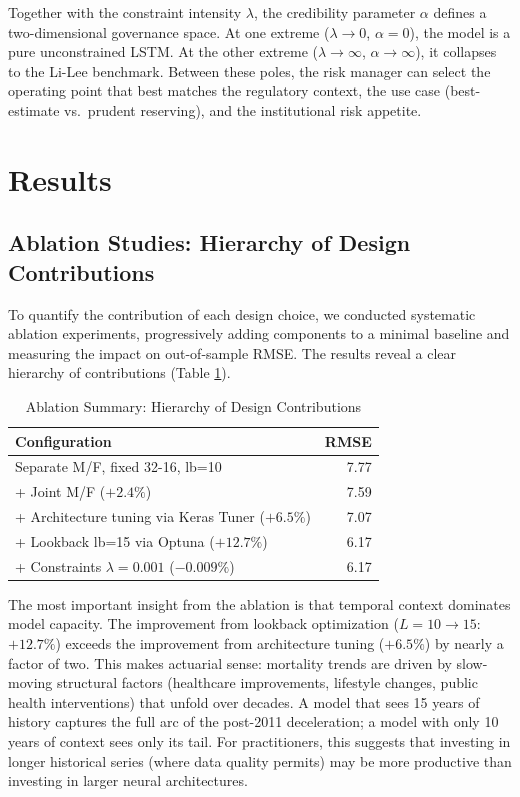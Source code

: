 \documentclass[11pt,a4paper]{article}
\begin{document}
Together with the constraint intensity $\lambda$, the credibility parameter $\alpha$ defines a two-dimensional governance space. At one extreme ($\lambda \to 0$, $\alpha = 0$), the model is a pure unconstrained LSTM. At the other extreme ($\lambda \to \infty$, $\alpha \to \infty$), it collapses to the Li-Lee benchmark. Between these poles, the risk manager can select the operating point that best matches the regulatory context, the use case (best-estimate vs.\ prudent reserving), and the institutional risk appetite.




\section{Results}

\subsection{Ablation Studies: Hierarchy of Design Contributions}

To quantify the contribution of each design choice, we conducted systematic ablation experiments, progressively adding components to a minimal baseline and measuring the impact on out-of-sample RMSE. The results reveal a clear hierarchy of contributions (Table \ref{tab:ablation}).

\begin{table}[H]
\centering
\caption{Ablation Summary: Hierarchy of Design Contributions}
\label{tab:ablation}
\begin{tabular}{@{}lr@{}}
\toprule
Configuration & RMSE \\ \midrule
Separate M/F, fixed 32-16, lb=10 & 7.77 \\
+ Joint M/F ($+2.4\%$) & 7.59 \\
+ Architecture tuning via Keras Tuner ($+6.5\%$) & 7.07 \\
+ Lookback lb=15 via Optuna ($+12.7\%$) & 6.17 \\
+ Constraints $\lambda = 0.001$ ($-0.009\%$) & 6.17 \\
\bottomrule
\end{tabular}
\end{table}

The most important insight from the ablation is that temporal context dominates model capacity. The improvement from lookback optimization ($L = 10 \to 15$: $+12.7\%$) exceeds the improvement from architecture tuning ($+6.5\%$) by nearly a factor of two. This makes actuarial sense: mortality trends are driven by slow-moving structural factors (healthcare improvements, lifestyle changes, public health interventions) that unfold over decades. A model that sees 15 years of history captures the full arc of the post-2011 deceleration; a model with only 10 years of context sees only its tail. For practitioners, this suggests that investing in longer historical series (where data quality permits) may be more productive than investing in larger neural architectures.
\end{document}
